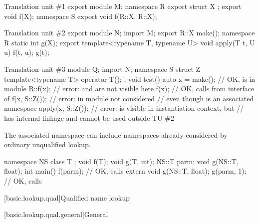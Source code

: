 \pnum
\begin{example}
\begin{codeblocktu}{Translation unit \#1}
export module M;
namespace R {
  export struct X {};
  export void f(X);
}
namespace S {
  export void f(R::X, R::X);
}
\end{codeblocktu}

\begin{codeblocktu}{Translation unit \#2}
export module N;
import M;
export R::X make();
namespace R { static int g(X); }
export template<typename T, typename U> void apply(T t, U u) {
  f(t, u);
  g(t);
}
\end{codeblocktu}

\begin{codeblocktu}{Translation unit \#3}
module Q;
import N;
namespace S {
  struct Z { template<typename T> operator T(); };
}
void test() {
  auto x = make();              // OK,  is  in module 
  R::f(x);                      // error:  and  are not visible here
  f(x);                         // OK, calls  from interface of 
  f(x, S::Z());                 // error:  in module  not considered
                                // even though  is an associated namespace
  apply(x, S::Z());             // error:  is visible in instantiation context, but
                                //  has internal linkage and cannot be used outside TU \#2
}
\end{codeblocktu}
\end{example}

\pnum
\begin{note}
The associated namespace can include namespaces
already considered by ordinary unqualified lookup.
\end{note}
\begin{example}
\begin{codeblock}
namespace NS {
  class T { };
  void f(T);
  void g(T, int);
}
NS::T parm;
void g(NS::T, float);
int main() {
  f(parm);                      // OK, calls 
  extern void g(NS::T, float);
  g(parm, 1);                   // OK, calls 
}
\end{codeblock}
\end{example}

[basic.lookup.qual]{Qualified name lookup}

[basic.lookup.qual.general]{General}

